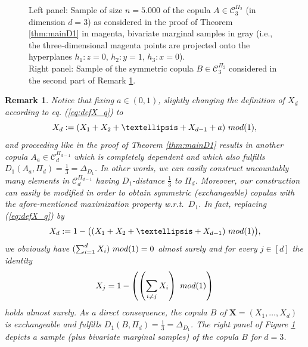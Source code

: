 \documentclass[10pt,a4paper]{amsart}
\newtheorem{remark}{Remark}
\newcommand{\kc}{\mathcal{C}}
\begin{document}
\begin{figure}[ht]
\begin{center}   
  
  
\end{center}
\caption{Left panel: Sample of size $n=5.000$ of the copula $A \in \kc_3^{\Pi_2}$ (in dimension $d=3$) as 
    considered in the proof of Theorem 
    \ref{thm:mainD1} in magenta, bivariate marginal samples in gray (i.e., the 
    three-dimensional magenta points are projected onto the hyperplanes $h_1: z=0$,
    $h_2: y=1$, $h_3: x=0$). \\
    Right panel: Sample of the symmetric copula $B\in \kc_3^{\Pi_2}$ considered in the second 
    part of Remark \ref{rem:symm}.}
    \label{fig1}
\end{figure}

\begin{remark}\label{rem:symm}
    Notice that fixing $a \in (0,1)$, slightly changing the definition 
    of $X_d$ according to eq. (\ref{eq:defX_q}) to 
    \begin{equation*}
        X_d:= (X_1 + X_2 + \ldots + X_{d-1} + a)  \,\, \textup{mod (1)}, 
    \end{equation*}
    and proceeding like in the proof of Theorem \ref{thm:mainD1}
    results in another copula $A_a \in \kc_d^{\Pi_{d-1}}$ 
    which is completely dependent and which also fulfills 
    $D_1(A_a,\Pi_d)=\frac{1}{3}=\Delta_{D_1}$. 
    In other words, we can easily construct uncountably many elements in 
    $\kc_d^{\Pi_{d-1}}$ having $D_1$-distance $\frac{1}{3}$ to $\Pi_d$.
    Moreover, our construction can easily be modified in order to obtain symmetric 
    (exchangeable) copulas with the afore-mentioned maximization property
    w.r.t.~$D_1$. 
    In fact, replacing (\ref{eq:defX_q}) by 
    \begin{equation*}
        X_d:= 1 - \big((X_1 + X_2 + \ldots + X_{d-1})  \,\, \textup{mod (1)}\big), 
    \end{equation*}
    we obviously have $(\sum_{i=1}^d X_i) \,\,\textup{mod (1)} =0$ almost surely and for every 
    $j \in [d]$ the identity 
    $$
     X_j = 1 - \left(\left(\sum_{i\neq j} X_i\right)  \,\, \textup{mod (1)}\right)
    $$
    holds almost surely. As a direct consequence, the copula $B$ of $\mathbf{X}=(X_1,\ldots,X_d)$ is
    exchangeable and fulfills $D_1(B,\Pi_d)=\frac{1}{3}=\Delta_{D_1}$. 
    The right panel of Figure \ref{fig1} depicts a sample (plus bivariate marginal samples) 
    of the copula $B$ for $d=3$.
\end{remark}
\end{document}
